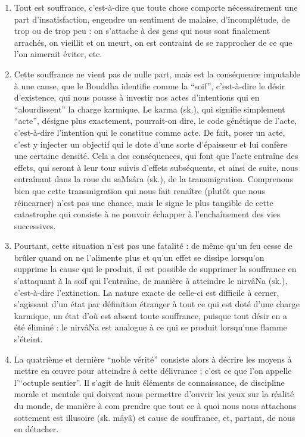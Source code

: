 \begin{enumerate}
	\item Tout est souffrance, c'est-à-dire que toute chose comporte nécessairement
		une part d'insatisfaction, engendre un sentiment de malaise, d'incomplétude, de trop ou
		de trop peu : on s'attache à des gens qui nous sont finalement arrachés, on vieillit et on
		meurt, on est contraint de se rapprocher de ce que l'on aimerait éviter, etc.
	\item Cette souffrance ne vient pas de nulle part, mais est la conséquence imputable à une
		cause, que le Bouddha identifie comme la ``soif'', c'est-à-dire le désir
		d'existence, qui nous pousse à investir nos actes d'intentions qui en ``alourdissent'' la
		charge karmique.
		Le karma (sk.), qui signifie simplement ``acte'', désigne plus exactement, pourrait-on dire, le code génétique de l'acte, c'est-à-dire l'intention qui le
		constitue comme acte.
De fait, poser un acte, c'est y injecter un objectif qui le dote
		d'une sorte d'épaisseur et lui confère une certaine densité.
Cela a des conséquences, qui
		font que l'acte entraîne des effets, qui seront à leur tour suivis d'effets subséquents, et
		ainsi de suite, nous entraînant dans la roue du saMsâra (sk.), de la transmigration.
		Comprenons bien que cette transmigration qui nous fait renaître (plutôt que nous réincarner) n'est pas une chance, mais le signe le plus tangible de cette catastrophe qui
		consiste à ne pouvoir échapper à l'enchaînement des vies successives.
	\item Pourtant, cette situation n'est pas une fatalité : de même qu'un feu cesse de brûler
		quand on ne l'alimente plus et qu'un effet se dissipe lorsqu'on supprime la cause qui le
		produit, il est possible de supprimer la souffrance en s'attaquant à la soif qui l'entraîne,
		de manière à atteindre le nirvâNa (sk.), c'est-à-dire l'extinction.
La nature exacte de
		celle-ci est difficile à cerner, s'agissant d'un état par définition étranger à tout ce qui est
		doté d'une charge karmique, un état d'où est absent toute souffrance, puisque tout désir
		en a été éliminé : le nirvâNa est analogue à ce qui se produit lorsqu'une flamme s'éteint.
	\item La quatrième et dernière ``noble vérité'' consiste alors à décrire les moyens à mettre
		en œuvre pour atteindre à cette délivrance ; c'est ce que l'on appelle l'``octuple sentier''.
Il s'agit de huit éléments de connaissance, de discipline morale et mentale qui
		doivent nous permettre d'ouvrir les yeux sur la réalité du monde, de manière à com		prendre que tout ce à quoi nous nous attachons sottement est illusoire (sk. mâyâ) et
		cause de souffrance, et, partant, de nous en détacher.
\end{enumerate}
